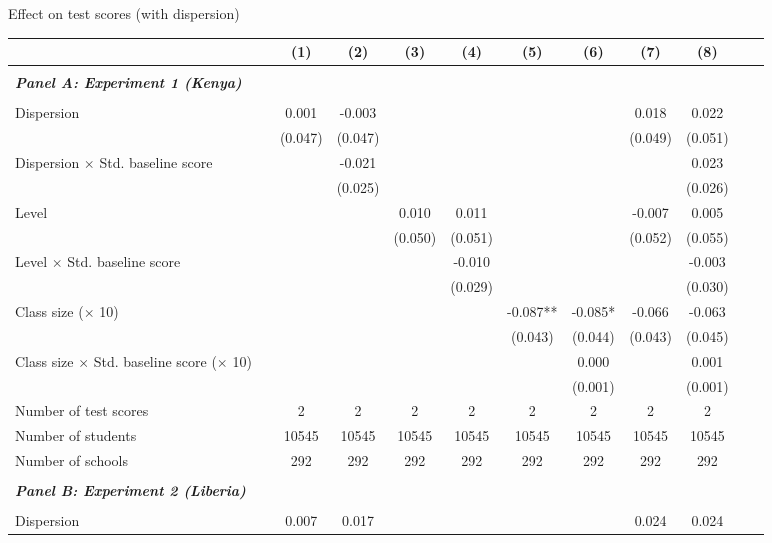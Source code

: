 \begin{center} 
\caption{\small Effect on test scores (with dispersion)} 
\label{tab:descriptives} 
\begin{scriptsize}
\begin{threeparttable}
\begin{tabular} {@{} l l c c c c c c c c c c  @{}} \toprule \toprule
& &(1)&(2)&(3)&(4)&(5)&(6)&(7)&(8) \\ \midrule 
\\
\multicolumn{3}{l}{\textbf{\textit{Panel A: Experiment 1 (Kenya)}}} \\
\\
Dispersion &  & 0.001 & -0.003 &  &  &  &  & 0.018 & 0.022 \\
                 &  & (0.047) & (0.047) &  &  &  &  & (0.049) & (0.051) \\
Dispersion $\times$ Std. baseline score &  &  & -0.021 &  &  &  &  &  & 0.023 \\
                 &  &  & (0.025) &  &  &  &  &  & (0.026) \\
Level &  &  &  & 0.010 & 0.011 &  &  & -0.007 & 0.005 \\
                 &  &  &  & (0.050) & (0.051) &  &  & (0.052) & (0.055) \\
Level $\times$ Std. baseline score &  &  &  &  & -0.010 &  &  &  & -0.003 \\
                 &  &  &  &  & (0.029) &  &  &  & (0.030) \\
Class size ($\times$ 10) &  &  &  &  &  & -0.087** & -0.085* & -0.066 & -0.063 \\
                 &  &  &  &  &  & (0.043) & (0.044) & (0.043) & (0.045) \\
Class size $\times$ Std. baseline score ($\times$ 10) &  &  &  &  &  &  & 0.000 &  & 0.001 \\
                 &  &  &  &  &  &  & (0.001) &  & (0.001) \\
\midrule
Number of test scores &  & 2 & 2 & 2 & 2 & 2 & 2 & 2 & 2 \\
Number of students &  & 10545 & 10545 & 10545 & 10545 & 10545 & 10545 & 10545 & 10545 \\
Number of schools &  & 292 & 292 & 292 & 292 & 292 & 292 & 292 & 292 \\
 \midrule
\\
\multicolumn{3}{l}{\textbf{\textit{Panel B: Experiment 2 (Liberia)}}} \\
\\
Dispersion &  & 0.007 & 0.017 &  &  &  &  & 0.024 & 0.024 \\

\end{tabular}
\end{threeparttable}
\end{scriptsize}
\end{center}
